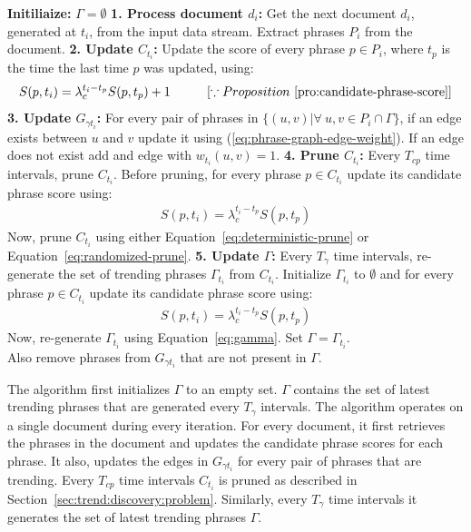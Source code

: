 \documentclass{sig-alternate}
\begin{document}
\newcommand{\TrendPhrasesDiscovery}{\ensuremath{\mbox{\sc TrendPhrasesDiscovery}}}
\begin{algorithm}[t]
\caption{$\TrendPhrasesDiscovery$}
\begin{algorithmic}
\STATE \textbf{Initiliaize:}  $\Gamma = \emptyset$
\STATE \textbf{1. Process document $d_i$:} Get the next document $d_i$, generated at $t_i$, from the input data stream. Extract phrases $P_i$ from the document.
\STATE \textbf{2. Update $C_{t_i}$:} Update the score of every phrase $p \in P_i$, where $t_p$ is the time the last time $p$ was updated, using:
\begin{align*}
S(p, t_i) =  \lambda_c ^{t_{i}-t_{p}} S(p, t_p) + 1 \hspace{0.4in}[\because Proposition~\ref{pro:candidate-phrase-score}]
\end{align*}
\STATE \textbf{3. Update $G_{\gamma t_i}$:} For every pair of phrases in $ \{ (u, v) | \forall\ u,v \in P_i \cap \Gamma\}$, if an edge exists between $u$ and $v$ update it using (\ref{eq:phrase-graph-edge-weight}). If an edge does not exist add and edge with $w_{t_i}(u, v) = 1$.
\STATE  \textbf{4. Prune $C_{t_i}$:} Every $T_{cp}$ time intervals, prune $C_{t_i}$. Before pruning, for every phrase $p \in C_{t_i}$ update its candidate phrase score using:
\begin{align*}
S(p, t_i) =  \lambda_c ^{t_{i}-t_{p}} S(p, t_p) 
\end{align*}
Now, prune $C_{t_i}$ using either Equation~\ref{eq:deterministic-prune} or Equation~\ref{eq:randomized-prune}.
\STATE \textbf{5. Update $\Gamma$:} Every $T_\gamma$ time intervals, re-generate the set of trending phrases $\Gamma_{t_i}$ from $C_{t_i}$. Initialize $\Gamma_{t_i}$ to $\emptyset$ and for every phrase $p \in C_{t_i}$ update its candidate phrase score using:
\begin{align*}
S(p, t_i) =  \lambda_c ^{t_{i}-t_{p}} S(p, t_p) 
\end{align*}
Now, re-generate $\Gamma_{t_i}$ using Equation~\ref{eq:gamma}. Set $\Gamma = \Gamma_{t_i}$.\\
Also remove phrases from $G_{\gamma t_i}$ that are not present in $\Gamma$.
\ENDWHILE
\end{algorithmic}
\label{alg:trending-phrase-algorithm}
\end{algorithm}

The algorithm first initializes $\Gamma$ to an empty set. $\Gamma$ contains the set of latest trending phrases that are generated every $T_\gamma$ intervals. The algorithm operates on a single document during every iteration. For every document, it first retrieves the phrases in the document and updates the candidate phrase scores for each phrase. It also, updates the edges in $G_{\gamma {t_i}}$ for every pair of phrases that are trending. Every $T_{cp}$ time intervals $C_{t_i}$ is pruned as described in Section~\ref{sec:trend:discovery:problem}. Similarly, every $T_\gamma$ time intervals it generates the set of latest trending phrases $\Gamma$.
\end{document}
